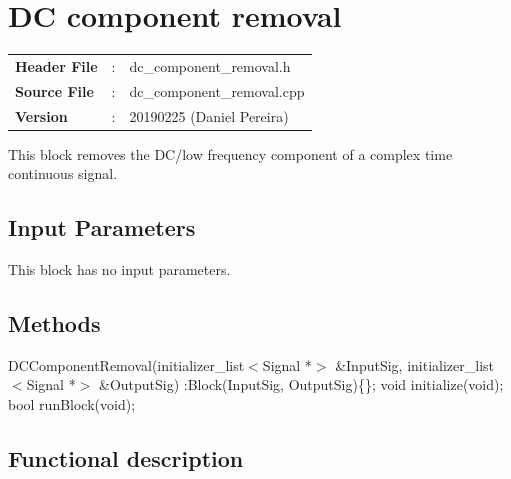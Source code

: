 \clearpage

\section{DC component removal}

\begin{tcolorbox}	
	\begin{tabular}{p{2.75cm} p{0.2cm} p{10.5cm}} 	
		\textbf{Header File}   &:& dc\_component\_removal.h \\
		\textbf{Source File}   &:& dc\_component\_removal.cpp \\
        \textbf{Version}       &:& 20190225 (Daniel Pereira)\\
	\end{tabular}
\end{tcolorbox}

This block removes the DC/low frequency component of a complex time continuous signal.

\subsection*{Input Parameters}

This block has no input parameters.

\subsection*{Methods}

\bigbreak
DCComponentRemoval(initializer\_list$<$Signal *$>$ \&InputSig, initializer\_list$<$Signal *$>$ \&OutputSig) :Block(InputSig, OutputSig)\{\};
\bigbreak
void initialize(void);
\bigbreak
bool runBlock(void);

\subsection*{Functional description}

